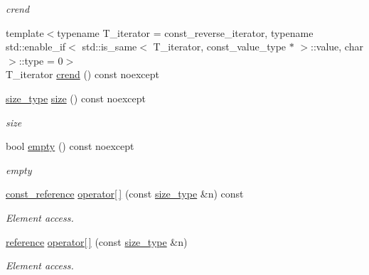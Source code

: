 \begin{DoxyCompactItemize}
\begin{DoxyCompactList}\small\item\em crend \end{DoxyCompactList}\item 
{\footnotesize template$<$typename T\+\_\+iterator  = const\+\_\+reverse\+\_\+iterator, typename std\+::enable\+\_\+if$<$ std\+::is\+\_\+same$<$ T\+\_\+iterator, const\+\_\+value\+\_\+type $\ast$ $>$\+::value, char $>$\+::type  = 0$>$ }\\T\+\_\+iterator \hyperlink{classIceBRG_1_1labeled__array__col__reference_a0f27d46dfc2dabc41437b83967b70087}{crend} () const  noexcept
\item 
\hyperlink{classIceBRG_1_1labeled__array__col__reference_a5b8295af3ddffec129715ff6b7744b7e}{size\+\_\+type} \hyperlink{classIceBRG_1_1labeled__array__col__reference_a40659e8bbcf1b42031bc43a20311c720}{size} () const  noexcept
\begin{DoxyCompactList}\small\item\em size \end{DoxyCompactList}\item 
bool \hyperlink{classIceBRG_1_1labeled__array__col__reference_a9e8344e6659502ee5e2d66bb6ebd56c3}{empty} () const  noexcept
\begin{DoxyCompactList}\small\item\em empty \end{DoxyCompactList}\item 
\hyperlink{classIceBRG_1_1labeled__array__col__reference_a2c7ae3d3e5b937e934ad83ea1269127d}{const\+\_\+reference} \hyperlink{classIceBRG_1_1labeled__array__col__reference_acd00c09cf37a061ed974d65e53c93db1}{operator\mbox{[}$\,$\mbox{]}} (const \hyperlink{classIceBRG_1_1labeled__array__col__reference_a5b8295af3ddffec129715ff6b7744b7e}{size\+\_\+type} \&n) const 
\begin{DoxyCompactList}\small\item\em Element access. \end{DoxyCompactList}\item 
\hyperlink{classIceBRG_1_1labeled__array__col__reference_aab5b1a7515a3d5bb8e5ead3f3a8319f6}{reference} \hyperlink{classIceBRG_1_1labeled__array__col__reference_a688cb048bffa353f74b8c76ee366f8d9}{operator\mbox{[}$\,$\mbox{]}} (const \hyperlink{classIceBRG_1_1labeled__array__col__reference_a5b8295af3ddffec129715ff6b7744b7e}{size\+\_\+type} \&n)
\begin{DoxyCompactList}\small\item\em Element access. \end{DoxyCompactList}\item 

\end{DoxyCompactItemize}
